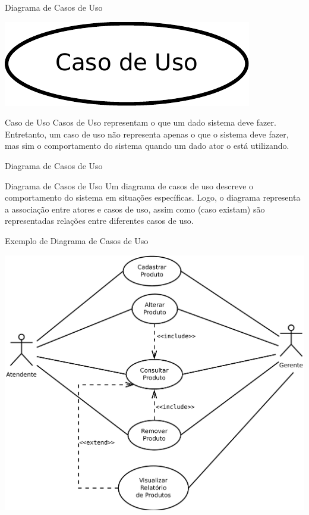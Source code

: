 \documentclass[xcolor=x11names,compress]{beamer}
\begin{document}
\begin{frame}{Diagrama de Casos de Uso}

\centering \includegraphics[keepaspectratio,width=.5\textwidth]{Caso_de_Uso}

\begin{alertblock}{Caso de Uso}
Casos de Uso representam o que um dado sistema deve fazer. Entretanto, um caso de uso não representa apenas o que o sistema deve fazer, mas sim o comportamento do sistema quando um dado ator o está utilizando.
\end{alertblock}

\end{frame}

\begin{frame}{Diagrama de Casos de Uso}

\begin{alertblock}{Diagrama de Casos de Uso}
Um diagrama de casos de uso descreve o comportamento do sistema em situações específicas. Logo, o diagrama representa a associação entre atores e casos de uso, assim como (caso existam) são representadas relações entre diferentes casos de uso.
\end{alertblock}

\end{frame}

\begin{frame}{Exemplo de Diagrama de Casos de Uso}

\centering \includegraphics[keepaspectratio,width=.7\textwidth]{Diagrama_Casos_De_Uso_Controle_Estoque}

\end{frame}
\end{document}
